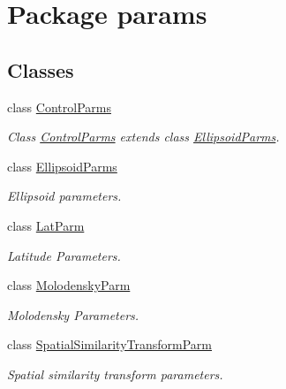 \hypertarget{namespaceparams}{}\section{Package params}
\label{namespaceparams}
\subsection*{Classes}
\begin{DoxyCompactItemize}
\item 
class \hyperlink{classparams_1_1_control_parms}{Control\+Parms}
\begin{DoxyCompactList}\small\item\em Class \hyperlink{classparams_1_1_control_parms}{Control\+Parms} extends class \hyperlink{classparams_1_1_ellipsoid_parms}{Ellipsoid\+Parms}. \end{DoxyCompactList}\item 
class \hyperlink{classparams_1_1_ellipsoid_parms}{Ellipsoid\+Parms}
\begin{DoxyCompactList}\small\item\em Ellipsoid parameters. \end{DoxyCompactList}\item 
class \hyperlink{classparams_1_1_lat_parm}{Lat\+Parm}
\begin{DoxyCompactList}\small\item\em Latitude Parameters. \end{DoxyCompactList}\item 
class \hyperlink{classparams_1_1_molodensky_parm}{Molodensky\+Parm}
\begin{DoxyCompactList}\small\item\em Molodensky Parameters. \end{DoxyCompactList}\item 
class \hyperlink{classparams_1_1_spatial_similarity_transform_parm}{Spatial\+Similarity\+Transform\+Parm}
\begin{DoxyCompactList}\small\item\em Spatial similarity transform parameters. \end{DoxyCompactList}\end{DoxyCompactItemize}
